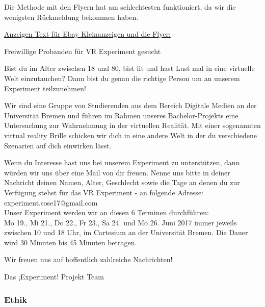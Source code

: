 \documentclass{Bericht}
\begin{document}
Die Methode mit den Flyern hat am schlechtesten funktioniert, da wir die wenigsten Rückmeldung bekommen haben.
\par

\underline{Anzeigen Text für Ebay Kleinanzeigen und die Flyer:}

Freiwillige Probanden für VR Experiment gesucht

Bist du im Alter zwischen 18 und 80, bist fit und hast Lust mal in eine virtuelle Welt einzutauchen? Dann bist du genau die richtige Person um an unserem Experiment teilzunehmen!

Wir sind eine Gruppe von Studierenden aus dem Bereich Digitale Medien an der Universität Bremen und führen im Rahmen unseres Bachelor-Projekts eine Untersuchung zur Wahrnehmung in der virtuellen Realität. Mit einer sogenannten \glqq virtual reality Brille\grqq{} schicken wir dich in eine andere Welt in der du verschiedene Szenarien auf dich einwirken lässt.

Wenn du Interesse hast uns bei unserem Experiment zu unterstützen, dann würden wir uns über eine Mail von dir freuen. Nenne uns bitte in deiner Nachricht deinen Namen, Alter, Geschlecht sowie die Tage an denen du zur Verfügung stehst für das VR Experiment - an folgende Adresse: experiment.sose17@gmail.com \\

Unser Experiment werden wir an diesen 6 Terminen durchführen: \\

Mo 19., Mi 21., Do 22., Fr 23., Sa 24. und Mo 26. Juni 2017 immer jeweils zwischen 10 und 18 Uhr, im Cartesium an der Universität Bremen. Die Dauer wird 30 Minuten bis 45 Minuten betragen.

Wir freuen uns auf hoffentlich zahlreiche Nachrichten!

Das ¡Experiment! Projekt Team

\subsubsection {Ethik}
\end{document}
